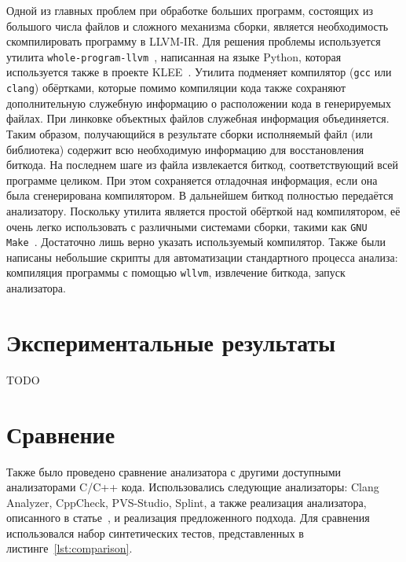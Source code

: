 Одной из главных проблем при обработке больших программ, состоящих из
большого числа файлов и сложного механизма сборки, является
необходимость скомпилировать программу в LLVM-IR. Для решения проблемы
используется утилита \texttt{whole-program-llvm}~\cite{wllvm},
написанная на языке Python, которая используется также в проекте
KLEE~\cite{cadar2008klee}. Утилита подменяет компилятор (\texttt{gcc}
или \texttt{clang}) обёртками, которые помимо компиляции кода также
сохраняют дополнительную служебную информацию о расположении кода в
генерируемых файлах. При линковке объектных файлов служебная
информация объединяется. Таким образом, получающийся в результате
сборки исполняемый файл (или библиотека) содержит всю необходимую
информацию для восстановления биткода. На последнем шаге из файла
извлекается биткод, соответствующий всей программе целиком. При этом
сохраняется отладочная информация, если она была сгенерирована
компилятором. В дальнейшем биткод полностью передаётся
анализатору. Поскольку утилита является простой обёрткой над
компилятором, её очень легко использовать с различными системами
сборки, такими как \texttt{GNU Make}~\cite{gnumake}. Достаточно лишь
верно указать используемый компилятор. Также были написаны небольшие
скрипты для автоматизации стандартного процесса анализа: компиляция
программы с помощью \texttt{wllvm}, извлечение биткода, запуск
анализатора.

\section{Экспериментальные результаты}

TODO

\section{Сравнение}

Также было проведено сравнение анализатора с другими доступными
анализаторами C/C++ кода. Использовались следующие анализаторы: Clang
Analyzer, CppCheck, PVS-Studio, Splint, а также реализация
анализатора, описанного в статье~\cite{li2010practical}, и реализация
предложенного подхода. Для сравнения использовался набор синтетических
тестов, представленных в листинге~\ref{lst:comparison}.

